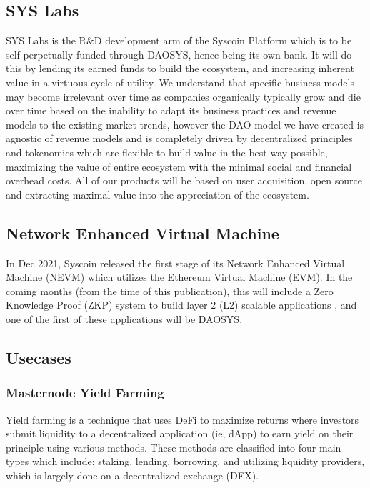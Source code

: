 \documentclass[journal,twocolumn,12pt]{ieeesyscoin}
\begin{document}
\subsection{SYS Labs}

SYS Labs is the R\&D development arm of the Syscoin Platform which is to be self-perpetually funded through DAOSYS, hence being its own bank. It will do this by lending its earned funds to build the ecosystem, and increasing inherent value in a virtuous cycle of utility. We understand that specific business models may become irrelevant over time as companies organically typically grow and die over time based on the inability to adapt its business practices and revenue models to the existing market trends, however the DAO model we have created is agnostic of revenue models and is completely driven by decentralized principles and tokenomics which are flexible to build value in the best way possible, maximizing the value of entire ecosystem with the minimal social and financial overhead costs. All of our products will be based on user acquisition, open source and extracting maximal value into the appreciation of the ecosystem.

\subsection{Network Enhanced Virtual Machine}

In Dec 2021, Syscoin released the first stage of its Network Enhanced Virtual Machine (NEVM) which utilizes the Ethereum Virtual Machine (EVM). In the coming months (from the time of this publication), this will include a Zero Knowledge Proof (ZKP) system to build layer 2 (L2) scalable applications \cite{Sig21a,Sig21b}, and one of the first of these applications will be DAOSYS.

\subsection{Usecases}

\subsubsection{Masternode Yield Farming}
\label{sec:yield_farming}

Yield farming is a technique that uses DeFi to maximize returns where investors submit liquidity to a decentralized application (ie, dApp) to earn yield on their principle using various methods. These methods are classified into four main types which include: staking, lending, borrowing, and utilizing liquidity providers, which is largely done on a decentralized exchange (DEX). 
\end{document}
